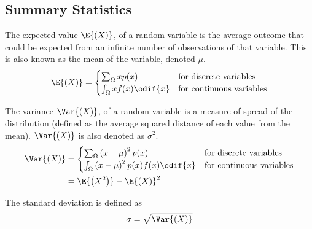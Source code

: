 \documentclass{article}
\begin{document}
\subsection{Summary Statistics}
\begin{definition}[Expectation]
    The expected value \(\E{\left( X \right)}\), of a random variable is the average
    outcome that could be expected from an infinite number of observations of that
    variable. This is also known as the mean of the variable, denoted \(\mu \).
    \begin{equation*}
        \E{\left( X \right)} =
        \begin{cases}
            \sum_{\Omega} x p(x)        & \text{for discrete variables}   \\
            \int_{\Omega} x f(x) \odif{x} & \text{for continuous variables}
        \end{cases}
    \end{equation*}
\end{definition}
\begin{definition}[Variance]
    The variance \(\Var{\left( X \right)}\), of a random variable is a measure of spread
    of the distribution (defined as the average squared distance of each value from the mean).
    \(\Var{\left( X \right)}\) is also denoted as \(\sigma^2\).
    \begin{align*}
        \Var{\left( X \right)} & =
        \begin{cases}
            \sum_{\Omega} \left( x - \mu \right)^2 p(x)             & \text{for discrete variables}   \\
            \int_{\Omega} \left( x - \mu \right)^2 p(x) f(x) \odif{x} & \text{for continuous variables}
        \end{cases} \\
                               & = \E{\left( X^2 \right)} - \E{\left( X \right)}^2
    \end{align*}
\end{definition}
\begin{definition}
    The standard deviation is defined as
    \begin{equation*}
        \sigma = \sqrt{\Var{\left( X \right)}}
    \end{equation*}
\end{definition}
\end{document}
